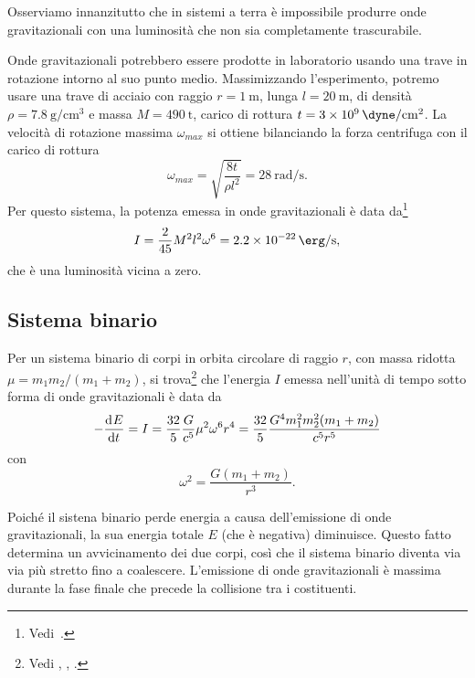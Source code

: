 Osserviamo innanzitutto che in sistemi a terra è impossibile produrre onde
gravitazionali con una luminosità che non sia completamente trascurabile.

Onde gravitazionali potrebbero essere prodotte in laboratorio usando una trave
in rotazione intorno al suo punto medio.  Massimizzando l'esperimento, potremo
usare una trave di acciaio con raggio $r = \SI{1}{\metre}$, lunga $l =
\SI{20}{\metre}$, di densità $\rho = \SI{7.8}{\gram\per\centi\metre\cubed}$ e
massa $M = \SI{490}{\tonne}$, carico di rottura $t =
\SI{3e9}{\dyne\per\centi\metre\squared}$.  La velocità di rotazione massima
$\omega_{max}$ si ottiene bilanciando la forza centrifuga con il carico di
rottura
\begin{equation}
  \omega_{max} = \sqrt{\frac{8t}{\rho l^{2}}} = \SI{28}{\radian\per\second}.
\end{equation}
Per questo sistema, la potenza emessa in onde gravitazionali è data
da\footnote{Vedi~\textcite[980]{misner:gravitation}.}
\begin{equation}
  I = \frac{2}{45} M^{2} l^{2} \omega^{6} = \SI{2.2e-22}{\erg\per\second},
\end{equation}
che è una luminosità vicina a zero.

\subsection{Sistema binario}
\label{sec:sistema-binario}

Per un sistema binario di corpi in orbita circolare di raggio $r$, con massa
ridotta $\mu = m_{1}m_{2}/(m_{1} + m_{2})$, si trova\footnote{Vedi
  \textcite[461]{landau:campi}, \textcite[986]{misner:gravitation},
  \textcite[476]{shapiro:black-holes}.}  che l'energia $I$ emessa nell'unità di
tempo sotto forma di onde gravitazionali è data da
\begin{equation}
  \label{eq:potenza-onde-sistema-binario}
  -\frac{{\mathop{}\!\mathrm{d}^{}}E}{\mathop{}\!\mathrm{d} {t}^{}} = I = \frac{32}{5} \frac{G}{c^{5}} \mu^{2} \omega^{6} r^{4} =
  \frac{32}{5} \frac{G^{4} m_{1}^{2} m_{2}^{2} (m_{1} + m_{2})}{c^{5}r^{5}}
\end{equation}
con
\begin{equation}
  \omega^{2} = \frac{G(m_{1} + m_{2})}{r^{3}}.
\end{equation}

Poiché il sistena binario perde energia a causa dell'emissione di onde
gravitazionali, la sua energia totale $E$ (che è negativa) diminuisce.  Questo
fatto determina un avvicinamento dei due corpi, così che il sistema binario
diventa via via più stretto fino a coalescere.  L'emissione di onde
gravitazionali è massima durante la fase finale che precede la collisione tra i
costituenti.

